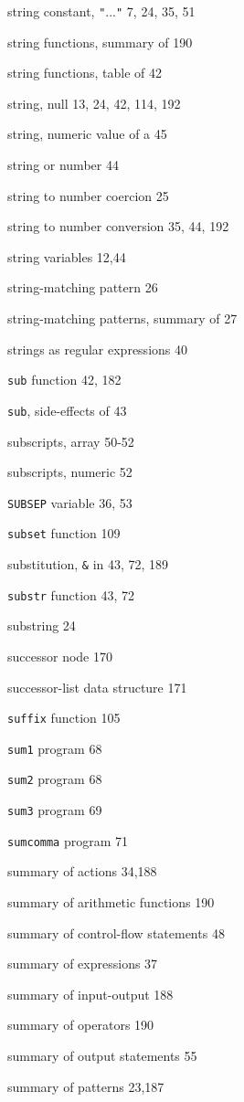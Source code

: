 \begin{multicols}{2}
string constant, \verb'"'...\verb'"' 7, 24, 35, 51

string functions, summary of 190

string functions, table of 42

string, null 13, 24, 42, 114, 192

string, numeric value of a 45

string or number 44

string to number coercion 25

string to number conversion 35, 44, 192

string variables 12,44

string-matching pattern 26

string-matching patterns, summary of 27

strings as regular expressions 40

\verb'sub' function 42, 182

\verb'sub', side-effects of 43

subscripts, array 50-52

subscripts, numeric 52

\verb'SUBSEP' variable 36, 53

\verb'subset' function 109

substitution, \verb'&' in 43, 72, 189

\verb'substr' function 43, 72

substring 24

successor node 170

successor-list data structure 171

\verb'suffix' function 105







\verb'sum1' program 68

\verb'sum2' program 68

\verb'sum3' program 69

\verb'sumcomma' program 71

summary of actions 34,188

summary of arithmetic functions 190

summary of control-flow statements 48

summary of expressions 37

summary of input-output 188

summary of operators 190

summary of output statements 55

summary of patterns 23,187


\end{multicols}
